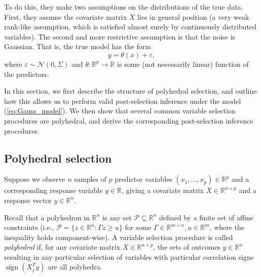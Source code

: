 \documentclass{article}
\newcommand{\R}{\mathbb{R}}
\newcommand{\sgn}{\operatorname{sign}}
\newcommand{\poly}{\mathcal{P}}
\begin{document}
To do this, they make two assumptions on the distributions of the true data.
First, they assume the covariate matrix $X$ lies in general position (a very
weak rank-like assumption, which is satisfied almost surely by continuously
distributed variables). The second and more restrictive assumption is that the
noise is Gaussian. That is, the true model has the form
\begin{equation}
y = \theta(x) + \varepsilon,
\label{eq:Gauss_model}
\end{equation}
where $\varepsilon \sim \mathcal{N}(0,\Sigma)$ and $\theta : \R^p \to \R$ is
some (not necessarily linear) function of the predictors.

In this section, we first describe the structure of polyhedral selection, and
outline how this allows us to perform valid post-selection inference under
the model (\ref{eq:Gauss_model}). We then show that several common variable
selection procedures are polyhedral, and derive the corresponding
post-selection inference procedures.

\subsection{Polyhedral selection}
\label{subsec:poly}
Suppose we observe $n$ samples of $p$ predictor variables
$(x_1,\dots,x_p) \in \R^p$ and a corresponding response variable $y \in \R$,
giving a covariate matrix $X \in \R^{n \times p}$ and a response vector
$y \in \R^n$.

Recall that a polyhedron in $\R^n$ is any set $\poly \subseteq \R^n$ defined by
a finite set of affine constraints (i.e.,
$\poly = \{z \in \R^n : \Gamma z \geq u\}$ for some
$\Gamma \in \R^{m \times n}, u \in \R^m$, where the inequality holds
component-wise). A variable selection procedure is called \emph{polyhedral} if,
for any covariate matrix $X \in \R^{n \times p}$, the sets of outcomes
$y \in \R^n$ resulting in any particular selection of variables with particular
correlation signs $\sgn(X_j^T y)$ are all polyhedra.
\end{document}
